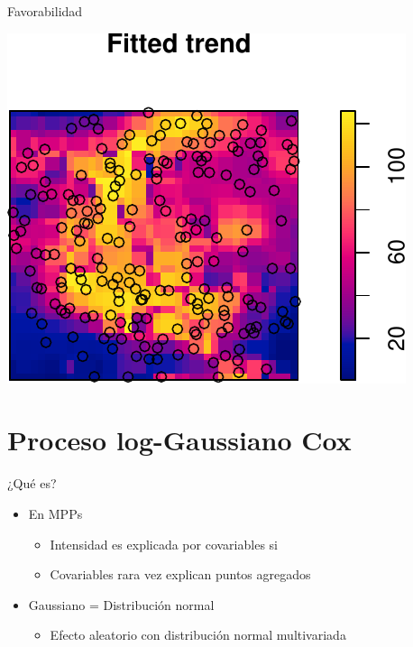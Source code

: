 \documentclass[
  11pt,
  ignorenonframetext,
]{beamer}
\providecommand{\tightlist}{%
  \setlength{\itemsep}{0pt}\setlength{\parskip}{0pt}}
\begin{document}
\begin{frame}{Favorabilidad}
\protect\hypertarget{favorabilidad}{}
\begin{center}\includegraphics{Tutorial-spatstat-2_files/figure-beamer/unnamed-chunk-34-1} \end{center}
\end{frame}

\hypertarget{proceso-log-gaussiano-cox}{%
\section{Proceso log-Gaussiano Cox}\label{proceso-log-gaussiano-cox}}

\begin{frame}{¿Qué es?}
\protect\hypertarget{quuxe9-es}{}
\begin{itemize}
\item
  En MPPs

  \begin{itemize}
  \tightlist
  \item
    Intensidad es explicada por covariables si
  \item
    Covariables rara vez explican puntos agregados
  \end{itemize}
\item
  Gaussiano = Distribución normal

  \begin{itemize}
  \tightlist
  \item
    Efecto aleatorio con distribución normal multivariada
  \end{itemize}
\end{itemize}
\end{frame}
\end{document}
